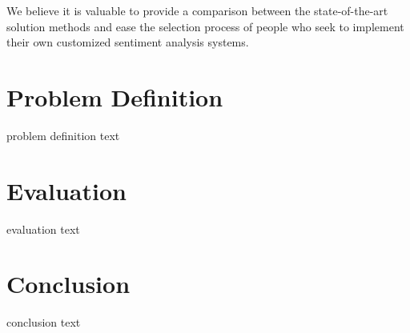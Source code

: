 \documentclass[11pt,a4paper]{article}
\begin{document}
We believe it is valuable to provide a comparison between the state-of-the-art solution methods and ease the selection process of people who seek to implement their own customized sentiment analysis systems.

\section{Problem Definition}
problem definition text

\section{Evaluation}
evaluation text

\section{Conclusion}
conclusion text



\end{document}
